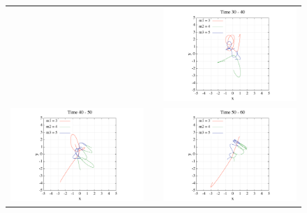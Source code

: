 \documentclass[11pt,a4paper,oneside,onecolumn]{jreport}
\begin{document}
\begin{figure}[H]
\begin{tabular}{ccc}
\begin{minipage}[t]{0.45\hsize}
\end{minipage} &
\begin{minipage}[t]{0.1\hsize}
\end{minipage} &
\begin{minipage}[t]{0.45\hsize}
\centering
\includegraphics[width=8cm]{./image/pythagoras_orbit_30to40.pdf}
\end{minipage}\\
%
\begin{minipage}[t]{0.45\hsize}
\centering
\includegraphics[width=8cm]{./image/pythagoras_orbit_40to50.pdf}
\end{minipage} &
\begin{minipage}[t]{0.1\hsize}
\end{minipage} &
\begin{minipage}[t]{0.45\hsize}
\centering
\includegraphics[width=8cm]{./image/pythagoras_orbit_50to60.pdf}

\end{minipage}
\end{tabular}
\end{figure}
\end{document}
